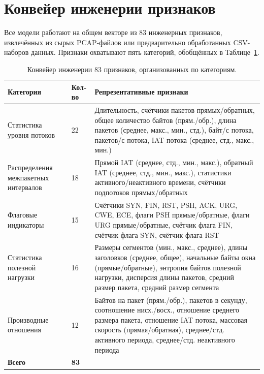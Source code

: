 \section{Конвейер инженерии признаков}
\label{sec:features}

Все модели работают на общем векторе из 83 инженерных признаков, извлечённых из сырых PCAP-файлов или предварительно обработанных CSV-наборов данных. Признаки охватывают пять категорий, обобщённых в Таблице~\ref{tab:features}.

\begin{table}[htbp]
\centering
\caption{Конвейер инженерии 83 признаков, организованных по категориям.}
\label{tab:features}
\small
\begin{tabular}{p{3.5cm} p{1.5cm} p{8.5cm}}
\toprule
\textbf{Категория} & \textbf{Кол-во} & \textbf{Репрезентативные признаки} \\
\midrule
Статистика уровня потоков & 22 & Длительность, счётчики пакетов прямых/обратных, общее количество байтов (прям./обр.), длина пакетов (среднее, макс., мин., стд.), байт/с потока, пакетов/с потока, IAT потока (среднее, стд., макс., мин.) \\
\addlinespace
Распределения межпакетных интервалов & 18 & Прямой IAT (среднее, стд., мин., макс.), обратный IAT (среднее, стд., мин., макс.), статистики активного/неактивного времени, счётчики подпотоков прямых/обратных \\
\addlinespace
Флаговые индикаторы & 15 & Счётчики SYN, FIN, RST, PSH, ACK, URG, CWE, ECE, флаги PSH прямые/обратные, флаги URG прямые/обратные, счётчик флага FIN, счётчик флага SYN, счётчик флага RST \\
\addlinespace
Статистика полезной нагрузки & 16 & Размеры сегментов (мин., макс., среднее), длины заголовков (среднее, общее), начальные байты окна (прямые/обратные), энтропия байтов полезной нагрузки, дисперсия длины пакетов, средний размер пакета, средний размер сегмента \\
\addlinespace
Производные отношения & 12 & Байтов на пакет (прям./обр.), пакетов в секунду, соотношение нисх./восх., отношение среднего размера пакета, отношение IAT потока, массовая скорость (прямая/обратная), среднее/стд. активного периода, среднее/стд. неактивного периода \\
\midrule
\textbf{Всего} & \textbf{83} & \\
\bottomrule
\end{tabular}
\end{table}


